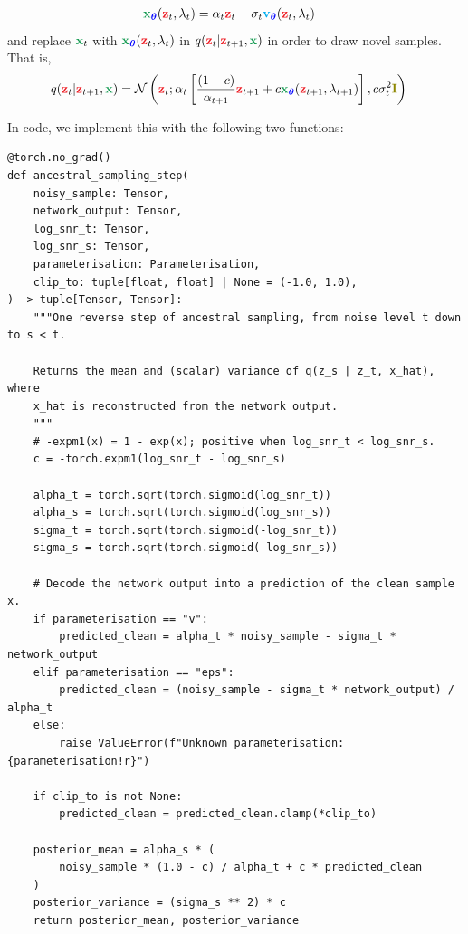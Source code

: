 \documentclass[usenames,dvipsnames]{article}
\newcommand{\myvec}[1]{\mathbf{#1}}
\newcommand{\myvecsym}[1]{\boldsymbol{#1}}
\newcommand{\vx}{\myvec{\textcolor{ForestGreen}{x}}}
\newcommand{\vz}{\myvec{\textcolor{Red}{z}}}
\newcommand{\vv}{\myvec{\textcolor{Cyan}{v}}}
\newcommand{\vI}{\myvec{\textcolor{olive}{I}}}
\newcommand{\vtheta}{\myvecsym{\textcolor{blue}{\theta}}}
\begin{document}
\begin{align}
\vx_{\vtheta}(\vz_t,\lambda_t) &=  \alpha_t \vz_t - \sigma_t \vv_{\vtheta}(\vz_t,\lambda_t)
\end{align}
and replace $\vx_{t}$ with $\vx_{\vtheta}(\vz_t,\lambda_t)$ in $q(\vz_{t}|\vz_{t+1}, \vx)$ in order to draw novel samples. That is,
\begin{align}
q(\vz_{t}|\vz_{t+1}, \vx) &=
\mathcal{N}\left(\vz_{t};  
\alpha_{t} \left[
\frac{(1-c)}{\alpha_{t+1}}
\vz_{t+1}
+ c \vx_{\vtheta}(\vz_{t+1},\lambda_{t+1})\right],
c \sigma_{t}^2
\vI\right)
\end{align}





In code, we implement this with the following two functions:



\begin{verbatim}
@torch.no_grad()
def ancestral_sampling_step(
    noisy_sample: Tensor,
    network_output: Tensor,
    log_snr_t: Tensor,
    log_snr_s: Tensor,
    parameterisation: Parameterisation,
    clip_to: tuple[float, float] | None = (-1.0, 1.0),
) -> tuple[Tensor, Tensor]:
    """One reverse step of ancestral sampling, from noise level t down to s < t.

    Returns the mean and (scalar) variance of q(z_s | z_t, x_hat), where
    x_hat is reconstructed from the network output.
    """
    # -expm1(x) = 1 - exp(x); positive when log_snr_t < log_snr_s.
    c = -torch.expm1(log_snr_t - log_snr_s)

    alpha_t = torch.sqrt(torch.sigmoid(log_snr_t))
    alpha_s = torch.sqrt(torch.sigmoid(log_snr_s))
    sigma_t = torch.sqrt(torch.sigmoid(-log_snr_t))
    sigma_s = torch.sqrt(torch.sigmoid(-log_snr_s))

    # Decode the network output into a prediction of the clean sample x.
    if parameterisation == "v":
        predicted_clean = alpha_t * noisy_sample - sigma_t * network_output
    elif parameterisation == "eps":
        predicted_clean = (noisy_sample - sigma_t * network_output) / alpha_t
    else:
        raise ValueError(f"Unknown parameterisation: {parameterisation!r}")

    if clip_to is not None:
        predicted_clean = predicted_clean.clamp(*clip_to)

    posterior_mean = alpha_s * (
        noisy_sample * (1.0 - c) / alpha_t + c * predicted_clean
    )
    posterior_variance = (sigma_s ** 2) * c
    return posterior_mean, posterior_variance
\end{verbatim}
\end{document}
